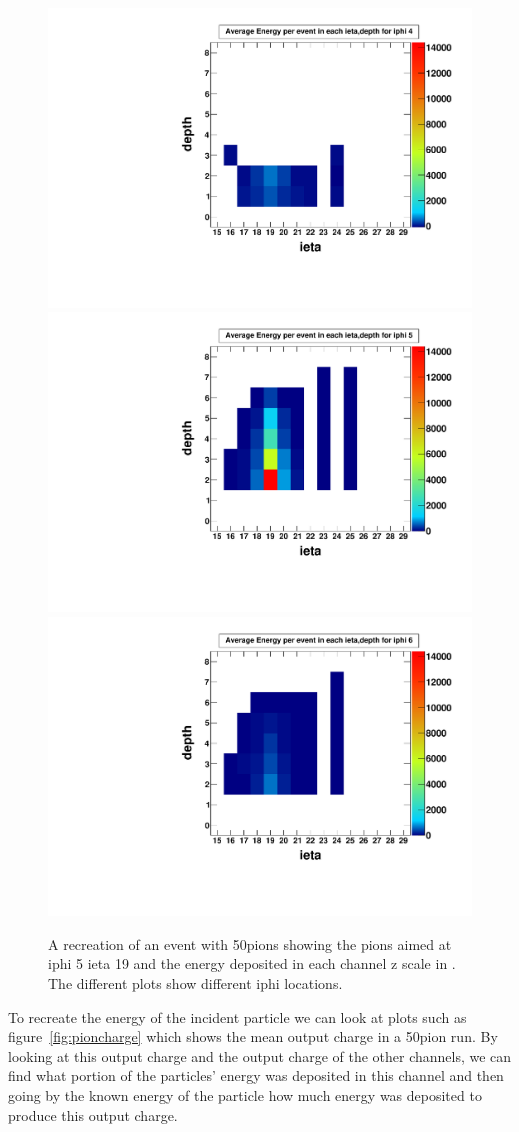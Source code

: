 \begin{figure}
\centering
\includegraphics[width=0.495\linewidth]{Figures/pionrun1.pdf}
\includegraphics[width=0.495\linewidth]{Figures/pionrun.pdf}
\includegraphics[width=0.495\linewidth]{Figures/pionrun2.pdf}
\caption{A recreation of an event with 50\GeV\space pions showing the pions aimed at iphi 5 ieta 19 and the energy deposited in each channel z scale in \MeV. The different plots show different iphi locations.}
\label{fig:pionmap}
\end{figure}

To recreate the energy of the incident particle we can look at plots such as figure~\ref{fig:pioncharge} which shows the mean output charge in a 50\GeV\space pion run. By looking at this output charge and the output charge of the other channels, we can find what portion of the particles' energy was deposited in this channel and then going by the known energy of the particle how much energy was deposited to produce this output charge. 

